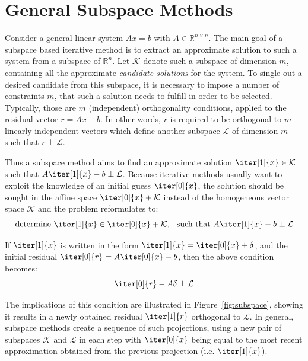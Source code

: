 \section{General Subspace Methods}
\label{sec:subspace_methods}

Consider a general linear system $Ax=b$ with $A \in \mathbb{R}^{n \times n}$. The main goal of a subspace based iterative method is to extract an approximate solution to such a system from a subspace of $\mathbb{R}^n$. Let $\mathcal{K}$ denote such a subspace of dimension $m$, containing all the approximate \textit{candidate solutions} for the system. To single out a desired candidate from this subspace, it is necessary to impose a number of constraints $m$, that such a solution needs to fulfill in order to be selected. Typically, those are $m$ (independent) orthogonality conditions, applied to the residual vector $r = Ax-b$. In other words, $r$ is required to be orthogonal to $m$ linearly independent vectors which define another subspace $\mathcal{L}$ of dimension $m$ such that $r \perp \mathcal{L}$.

Thus a subspace method aims to find an approximate solution $\iter[1]{x}\in \mathcal{K}$ such that $A\iter[1]{x}-b \perp \mathcal{L}$. Because iterative methods usually want to exploit the knowledge of an initial guess $\iter[0]{x}$, the solution should be sought in the affine space $\iter[0]{x}+\mathcal{K}$ instead of the homogeneous vector space $\mathcal{K}$ \cite{saad_iterative_2003} and the problem reformulates to:
\begin{equation}
    \text{determine } \iter[1]{x} \in \iter[0]{x}+\mathcal{K}\text{,}\;\;\text{  such that } A\iter[1]{x}-b \perp \mathcal{L}
\end{equation}

\noindent If $\iter[1]{x}$ is written in the form $\iter[1]{x}=\iter[0]{x}+\delta$, and the initial residual $\iter[0]{r} = A\iter[0]{x}-b$, then the above condition becomes:
\begin{equation}
    \iter[0]{r} - A\delta \perp \mathcal{L}
\end{equation}

\noindent The implications of this condition are illustrated in Figure~\hyperref[fig:subspace]{\ref{fig:subspace}}, showing it results in a  newly obtained residual $\iter[1]{r}$ orthogonal to $\mathcal{L}$. In general, subspace methods create a sequence of such projections, using a new pair of subspaces $\mathcal{K}$ and $\mathcal{L}$ in each step with $\iter[0]{x}$ being equal to the most recent approximation obtained from the previous projection (i.e. $\iter[1]{x}$).

